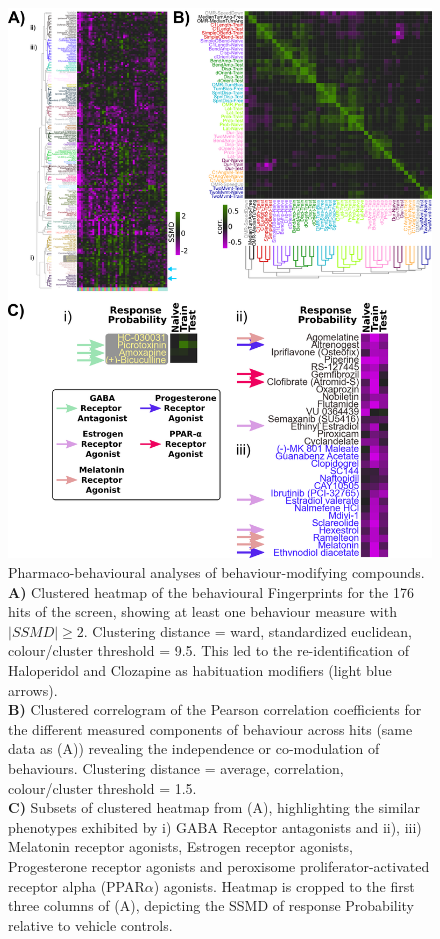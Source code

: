 \documentclass[9pt,lineno]{RandlettLab_elife}
\begin{document}
\begin{figure}
\begin{fullwidth}
\begin{center}
\includegraphics[width=0.75\linewidth]{Figure4 - DrugClustering.png}
\caption{
Pharmaco-behavioural analyses of behaviour-modifying compounds. 
\\ \textbf{A)} Clustered heatmap of the behavioural Fingerprints for the 176 hits of the screen, showing at least one behaviour measure with $ |SSMD| \geq 2 $. Clustering distance = ward, standardized euclidean, colour/cluster threshold = 9.5. This led to the re-identification of Haloperidol and Clozapine as habituation modifiers (light blue arrows). 
\\ \textbf{B)} Clustered correlogram of the Pearson correlation coefficients for the different measured components of behaviour across hits (same data as (A)) revealing the independence or co-modulation of behaviours. Clustering distance = average, correlation, colour/cluster threshold = 1.5.
\\ \textbf{C)} Subsets of clustered heatmap from (A), highlighting the similar phenotypes exhibited by i) GABA Receptor antagonists and ii), iii) Melatonin receptor agonists, Estrogen receptor agonists, Progesterone receptor agonists and peroxisome proliferator-activated receptor alpha (PPAR$\alpha$) agonists. Heatmap is cropped to the first three columns of (A), depicting the SSMD of response Probability relative to vehicle controls.  
}
\label{fig:4}
\end{center}
\end{fullwidth}
\end{figure}
\end{document}
